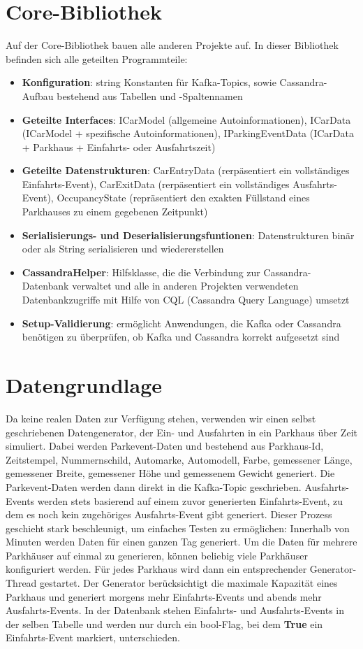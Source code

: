 \section{Core-Bibliothek}
Auf der Core-Bibliothek bauen alle anderen Projekte auf.
In dieser Bibliothek befinden sich alle geteilten Programmteile:
\begin{itemize}
    \item \textbf{Konfiguration}: string Konstanten für Kafka-Topics, sowie Cassandra-Aufbau bestehend aus Tabellen und -Spaltennamen
    \item \textbf{Geteilte Interfaces}: ICarModel (allgemeine Autoinformationen), ICarData (ICarModel + spezifische Autoinformationen), IParkingEventData (ICarData + Parkhaus + Einfahrts- oder Ausfahrtszeit)
    \item \textbf{Geteilte Datenstrukturen}: CarEntryData (rerpäsentiert ein vollständiges Einfahrts-Event), CarExitData (rerpäsentiert ein vollständiges Ausfahrts-Event), OccupancyState (repräsentiert den exakten Füllstand eines Parkhauses zu einem gegebenen Zeitpunkt)
    \item \textbf{Serialisierungs- und Deserialisierungsfuntionen}: Datenstrukturen binär oder als String serialisieren und wiedererstellen
    \item \textbf{CassandraHelper}: Hilfsklasse, die die Verbindung zur Cassandra-Datenbank verwaltet und alle in anderen Projekten verwendeten Datenbankzugriffe mit Hilfe von CQL (Cassandra Query Language) umsetzt
    \item \textbf{Setup-Validierung}: ermöglicht Anwendungen, die Kafka oder Cassandra benötigen zu überprüfen, ob Kafka und Cassandra korrekt aufgesetzt sind
\end{itemize}


\section{Datengrundlage}
Da keine realen Daten zur Verfügung stehen, verwenden wir einen selbst geschriebenen Datengenerator, der Ein- und Ausfahrten in ein Parkhaus über Zeit simuliert.
Dabei werden Parkevent-Daten  und  bestehend aus Parkhaus-Id, Zeitstempel, Nummernschild, Automarke, Automodell, Farbe, gemessener Länge, gemessener Breite, gemessener Höhe und gemessenem Gewicht generiert.
Die Parkevent-Daten werden dann direkt in die Kafka-Topic  geschrieben.
Ausfahrts-Events werden stets basierend auf einem zuvor generierten Einfahrts-Event, zu dem es noch kein zugehöriges Ausfahrts-Event gibt generiert.
Dieser Prozess geschieht stark beschleunigt, um einfaches Testen zu ermöglichen: Innerhalb von Minuten werden Daten für einen ganzen Tag generiert.
Um die Daten für mehrere Parkhäuser auf einmal zu generieren, können beliebig viele Parkhäuser konfiguriert werden.
Für jedes Parkhaus wird dann ein entsprechender Generator-Thread gestartet.
Der Generator berücksichtigt die maximale Kapazität eines Parkhaus und generiert morgens mehr Einfahrts-Events und abends mehr Ausfahrts-Events.
In der Datenbank stehen Einfahrts- und Ausfahrts-Events in der selben Tabelle und werden nur durch ein bool-Flag, bei dem \textbf{True} ein Einfahrts-Event markiert, unterschieden.


